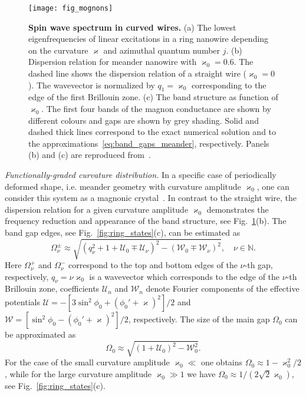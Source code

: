 \begin{figure}[t]
	\texttt{[image: fig\_mognons]}
	\caption{\label{fig:magnons}%
		\textbf{Spin wave spectrum in curved wires.} (a) The lowest eigenfrequencies of linear excitations in a ring nanowire depending on the curvature $\varkappa$ and azimuthal quantum number $j$. (b) Dispersion relation for meander nanowire with  $\varkappa_0=0.6$. The dashed line shows the dispersion relation of a straight wire ($\varkappa_0=0$). The wavevector is normalized by $q_1=\varkappa_0$ corresponding to the edge of the first Brillouin zone. (c) The band structure as function of $\varkappa_0$. The first four bands of the magnon conductance are shown by different colours and gaps are shown by grey shading. Solid and dashed thick lines correspond to the exact numerical solution and to the approximations~\eqref{eq:band_gaps_meander}, respectively. Panels (b) and (c) are reproduced from~\cite{Korniienko19b}.}
\end{figure}

{\it Functionally-graded curvature distribution.} In a specific case of periodically deformed shape, i.e. meander geometry with curvature amplitude $\varkappa_0$, one can consider this system as a magnonic crystal~\cite{Korniienko19b}. In contrast to the straight wire, the dispersion relation for a given curvature amplitude $\varkappa_0$ demonstrates the frequency reduction and appearance of the band structure, see Fig.~\ref{fig:magnons}(b). The band gap edges, see Fig.~\ref{fig:ring_states}(c), can be estimated as~\cite{Korniienko19b}
\begin{equation}
	\Omega^{\pm}_\nu\approx\sqrt{\left(q^2_\nu+1+\mathcal{U}_0\mp \mathcal{U}_\nu\right)^2-\left(\mathcal{W}_0\mp \mathcal{W}_\nu\right)^2}, \quad \nu\in\mathbb{N}.
\end{equation}
Here $\Omega^{+}_\nu$ and $\Omega^{-}_\nu$ correspond to the top and bottom edges of the $\nu$-th gap, respectively, $q_\nu = \nu\varkappa_0$ is a wavevector which corresponds to the edge of the $\nu$-th Brillouin zone, coefficients $\mathcal{U}_n$ and $\mathcal{W}_n$ denote Fourier components of the effective potentials $\mathcal{U} = -\left[3\sin^2\phi_0+\left(\phi_0'+\varkappa\right)^2\right]/2$ and $\mathcal{W} = \left[\sin^2\phi_0-\left(\phi_0'+\varkappa\right)^2\right]/2$, respectively. The size of the main gap $\Omega_0$ can be approximated as~\cite{Korniienko19b}
\begin{equation}\label{eq:band_gaps_meander}
\Omega_0\approx\sqrt{\left(1+\mathcal{U}_0\right)^2-\mathcal{W}_0^2}.
\end{equation}
For the case of the small curvature amplitude $\varkappa_0\ll$ one obtains $\Omega_0\approx1 - \varkappa_0^2/2$, while for the large curvature amplitude $\varkappa_0\gg1$ we have $\Omega_0\approx 1/\left(2\sqrt{2}\varkappa_0\right)$, see Fig.~\ref{fig:ring_states}(c).

